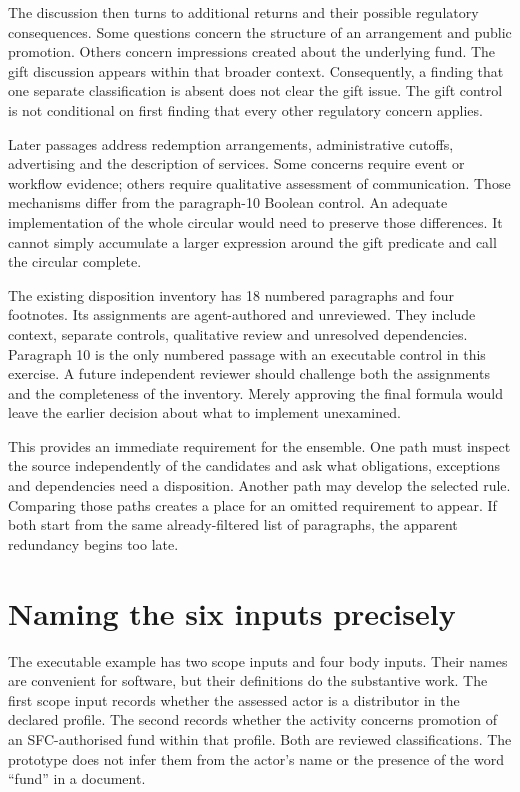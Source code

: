 \documentclass[12pt,a4paper,oneside,openany]{book}
\begin{document}
The discussion then turns to additional returns and their possible regulatory
consequences. Some questions concern the structure of an arrangement and public
promotion. Others concern impressions created about the underlying fund. The
gift discussion appears within that broader context. Consequently, a finding
that one separate classification is absent does not clear the gift issue. The
gift control is not conditional on first finding that every other regulatory
concern applies.

Later passages address redemption arrangements, administrative cutoffs,
advertising and the description of services. Some concerns require event or
workflow evidence; others require qualitative assessment of communication.
Those mechanisms differ from the paragraph-10 Boolean control. An adequate
implementation of the whole circular would need to preserve those differences.
It cannot simply accumulate a larger expression around the gift predicate and
call the circular complete.

The existing disposition inventory has 18 numbered paragraphs and four
footnotes. Its assignments are agent-authored and unreviewed. They include
context, separate controls, qualitative review and unresolved dependencies.
Paragraph 10 is the only numbered passage with an executable control in this
exercise. A future independent reviewer should challenge both the assignments
and the completeness of the inventory. Merely approving the final formula would
leave the earlier decision about what to implement unexamined.

This provides an immediate requirement for the ensemble. One path must inspect
the source independently of the candidates and ask what obligations, exceptions
and dependencies need a disposition. Another path may develop the selected
rule. Comparing those paths creates a place for an omitted requirement to
appear. If both start from the same already-filtered list of paragraphs, the
apparent redundancy begins too late.

\section{Naming the six inputs precisely}
\label{sec:circular-inputs}
The executable example has two scope inputs and four body inputs. Their names
are convenient for software, but their definitions do the substantive work.
The first scope input records whether the assessed actor is a distributor in
the declared profile. The second records whether the activity concerns promotion
of an SFC-authorised fund within that profile. Both are reviewed classifications.
The prototype does not infer them from the actor's name or the presence of the
word ``fund'' in a document.
\end{document}
